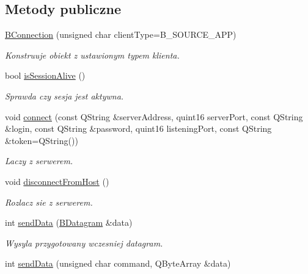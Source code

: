 \subsection*{Metody publiczne}
\begin{DoxyCompactItemize}
\item 
\hyperlink{class_b_connection_a9b85170ee6ea831111b50a55d45ef8eb}{BConnection} (unsigned char clientType=B\_\-SOURCE\_\-APP)
\begin{DoxyCompactList}\small\item\em Konstruuje obiekt z ustawionym typem klienta. \item\end{DoxyCompactList}\item 
bool \hyperlink{class_b_connection_a5a4985b2a3f559b448ce6660ba353acb}{isSessionAlive} ()
\begin{DoxyCompactList}\small\item\em Sprawda czy sesja jest aktywna. \item\end{DoxyCompactList}\item 
void \hyperlink{class_b_connection_aac501a13f453169ed00bc3d4f8664040}{connect} (const QString \&serverAddress, quint16 serverPort, const QString \&login, const QString \&password, quint16 listeningPort, const QString \&token=QString())
\begin{DoxyCompactList}\small\item\em Laczy z serwerem. \item\end{DoxyCompactList}\item 
void \hyperlink{class_b_connection_a9035d3ca3836f1c841e0f91327753f14}{disconnectFromHost} ()
\begin{DoxyCompactList}\small\item\em Rozlacz sie z serwerem. \item\end{DoxyCompactList}\item 
int \hyperlink{class_b_connection_a53b6835b9124709e108913103049910b}{sendData} (\hyperlink{class_b_datagram}{BDatagram} \&data)
\begin{DoxyCompactList}\small\item\em Wysyla przygotowany wczesniej datagram. \item\end{DoxyCompactList}\item 
int \hyperlink{class_b_connection_a77f411c1ec683bd571f41023609f2e7f}{sendData} (unsigned char command, QByteArray \&data)

\end{DoxyCompactItemize}
